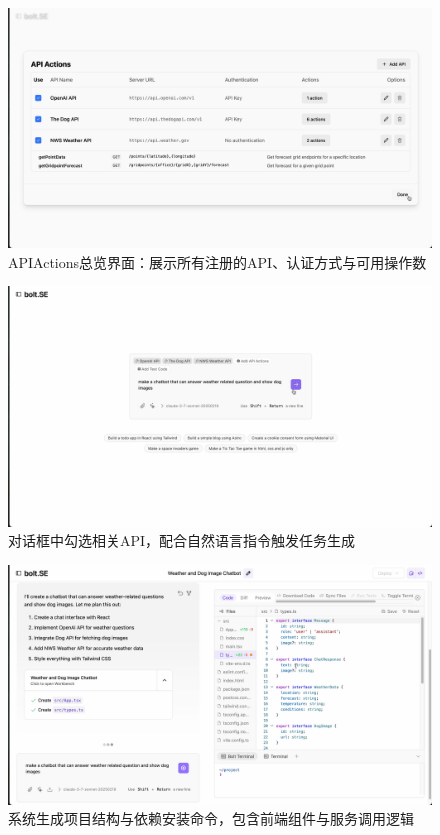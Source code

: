 \begin{figure}[H]
  \centering
  \includegraphics[width=\textwidth]{figures/screenshots/api-actions/demo_actions_table.png}
  \caption{APIActions总览界面：展示所有注册的API、认证方式与可用操作数}
  \label{fig:demo_table}
\end{figure}

\begin{figure}[H]
  \centering
  \includegraphics[width=\textwidth]{figures/screenshots/api-actions/demo_prompt_tags.png}
  \caption{对话框中勾选相关API，配合自然语言指令触发任务生成}
  \label{fig:demo_prompt}
\end{figure}

\begin{figure}[H]
  \centering
  \includegraphics[width=\textwidth]{figures/screenshots/api-actions/demo_plan_files.png}
  \caption{系统生成项目结构与依赖安装命令，包含前端组件与服务调用逻辑}
  \label{fig:demo_plan}
\end{figure}

